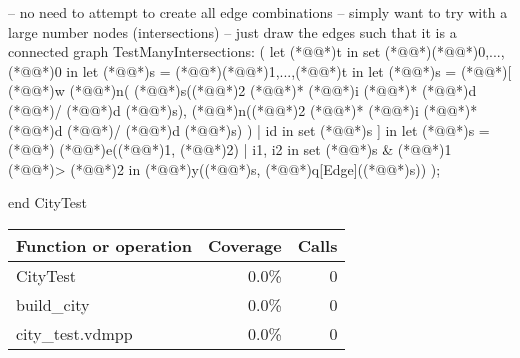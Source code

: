 \documentclass[a4paper]{article}
\begin{document}
\begin{vdm_al}
    -- no need to attempt to create all edge combinations
    -- simply want to try with a large number nodes (intersections)
    -- just draw the edges such that it is a connected graph
    TestManyIntersections:
        (
            let (*@@*)t in set (*@\vdmnotcovered{}@*){(*@\vdmnotcovered{}@*)0,...,(*@@*)0} in
                let (*@@*)s = (*@\vdmnotcovered{}@*){(*@\vdmnotcovered{}@*)1,...,(*@@*)t} in
                    let (*@@*)s = (*@\vdmnotcovered{}@*)[
                        (*@@*)w (*@@*)n(
                            (*@@*)s((*@\vdmnotcovered{}@*)2 (*@\vdmnotcovered{}@*)* (*@@*)i (*@\vdmnotcovered{}@*)* (*@@*)d (*@\vdmnotcovered{}@*)/ (*@@*)d (*@@*)s),
                            (*@@*)n((*@\vdmnotcovered{}@*)2 (*@\vdmnotcovered{}@*)* (*@@*)i (*@\vdmnotcovered{}@*)* (*@@*)d (*@\vdmnotcovered{}@*)/ (*@@*)d (*@@*)s)
                        )
                        | id in set (*@@*)s
                    ] in
                        let (*@@*)s = (*@\vdmnotcovered{}@*){
                            (*@@*)e((*@@*)1, (*@@*)2)
                            | i1, i2 in set (*@@*)s
                            & (*@@*)1 (*@\vdmnotcovered{<}@*)> (*@@*)2
                        } in (*@@*)y((*@@*)s, (*@@*)q[Edge]((*@@*)s))
        );


end CityTest
\end{vdm_al}
\bigskip
\begin{longtable}{|l|r|r|}
\hline
Function or operation & Coverage & Calls \\
\hline
\hline
CityTest & 0.0\% & 0 \\
\hline
build\_city & 0.0\% & 0 \\
\hline
\hline
city\_test.vdmpp & 0.0\% & 0 \\
\hline
\end{longtable}
\end{document}
